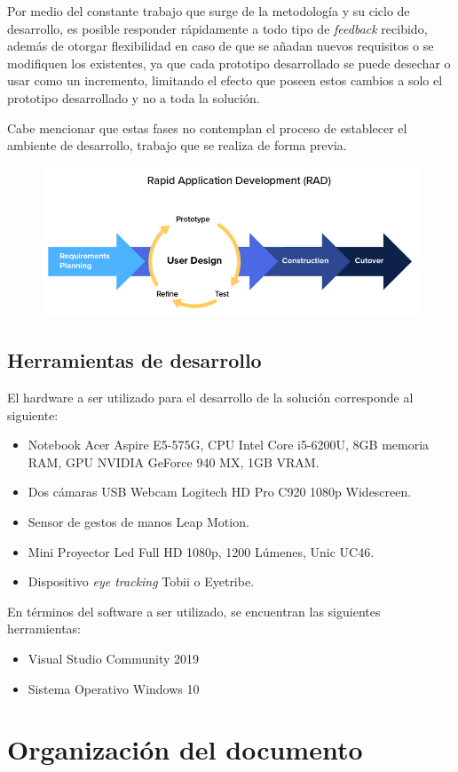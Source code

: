 Por medio del constante trabajo que surge de la metodología y su ciclo de desarrollo, es posible responder rápidamente a todo tipo de \textit{feedback} recibido, además de otorgar flexibilidad en caso de que se añadan nuevos requisitos o se modifiquen los existentes, ya que cada prototipo desarrollado se puede desechar o usar como un incremento, limitando el efecto que poseen estos cambios a solo el prototipo desarrollado y no a toda la solución.

Cabe mencionar que estas fases no contemplan el proceso de establecer el ambiente de desarrollo, trabajo que se realiza de forma previa.   

\begin{figure}[!hbtp]
	\centering
	\includegraphics[width=\textwidth]{images/misc/RAD.png}
	\label{fig:rad}
\end{figure}

\subsection{Herramientas de desarrollo}

El hardware a ser utilizado para el desarrollo de la solución corresponde al siguiente:
\begin{itemize}
    \item Notebook Acer Aspire E5-575G, CPU Intel Core i5-6200U, 8GB memoria RAM, GPU NVIDIA GeForce 940 MX, 1GB VRAM.
    \item Dos cámaras USB Webcam Logitech HD Pro C920 1080p Widescreen.
    \item Sensor de gestos de manos Leap Motion.
    \item Mini Proyector Led Full HD 1080p, 1200 Lúmenes, Unic UC46.
    \item Dispositivo \textit{eye tracking} Tobii o Eyetribe.
\end{itemize}   

En términos del software a ser utilizado, se encuentran las siguientes herramientas:
\begin{itemize}
    \item Visual Studio Community 2019
    \item Sistema Operativo Windows 10
\end{itemize}

\section{Organizaci\'on del documento}
\label{intro:organizacion}

